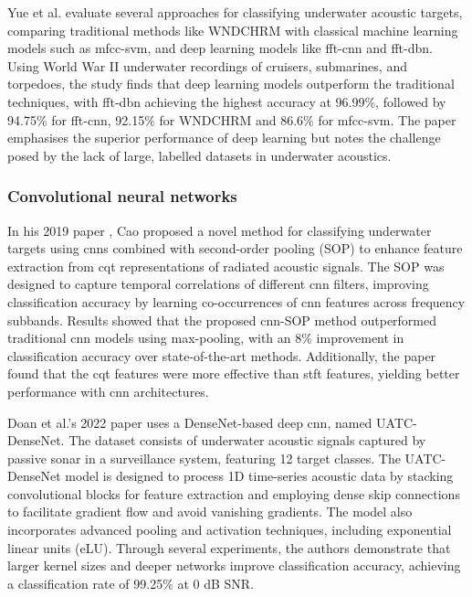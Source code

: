 Yue et al. \cite{yue_classification_2017} evaluate several approaches for classifying underwater acoustic targets, comparing traditional methods like WNDCHRM with classical machine learning models such as \acrshort{mfcc}-\acrshort{svm}, and deep learning models like \acrshort{fft}-\acrshort{cnn} and \acrshort{fft}-\acrshort{dbn}. Using World War II underwater recordings of cruisers, submarines, and torpedoes, the study finds that deep learning models outperform the traditional techniques, with \acrshort{fft}-\acrshort{dbn} achieving the highest accuracy at 96.99\%, followed by 94.75\% for \acrshort{fft}-\acrshort{cnn}, 92.15\% for WNDCHRM and 86.6\% for \acrshort{mfcc}-\acrshort{svm}. The paper emphasises the superior performance of deep learning but notes the challenge posed by the lack of large, labelled datasets in underwater acoustics.

\subsubsection{Convolutional neural networks}

In his 2019 paper \cite{cao_convolutional_2019}, Cao proposed a novel method for classifying underwater targets using \acrshort{cnn}s combined with second-order pooling (SOP) to enhance feature extraction from \acrshort{cqt} representations of radiated acoustic signals. The SOP was designed to capture temporal correlations of different \acrshort{cnn} filters, improving classification accuracy by learning co-occurrences of \acrshort{cnn} features across frequency subbands. Results showed that the proposed \acrshort{cnn}-SOP method outperformed traditional \acrshort{cnn} models using max-pooling, with an 8\% improvement in classification accuracy over state-of-the-art methods. Additionally, the paper found that the \acrshort{cqt} features were more effective than \acrshort{stft} features, yielding better performance with \acrshort{cnn} architectures.

Doan et al.'s 2022 paper \cite{doan_underwater_2022} uses a DenseNet-based deep \acrlong{cnn}, named UATC-DenseNet. The dataset consists of underwater acoustic signals captured by passive sonar in a surveillance system, featuring 12 target classes. The UATC-DenseNet model is designed to process 1D time-series acoustic data by stacking convolutional blocks for feature extraction and employing dense skip connections to facilitate gradient flow and avoid vanishing gradients. The model also incorporates advanced pooling and activation techniques, including exponential linear units (eLU). Through several experiments, the authors demonstrate that larger kernel sizes and deeper networks improve classification accuracy, achieving a classification rate of 99.25\% at 0 dB SNR. 

